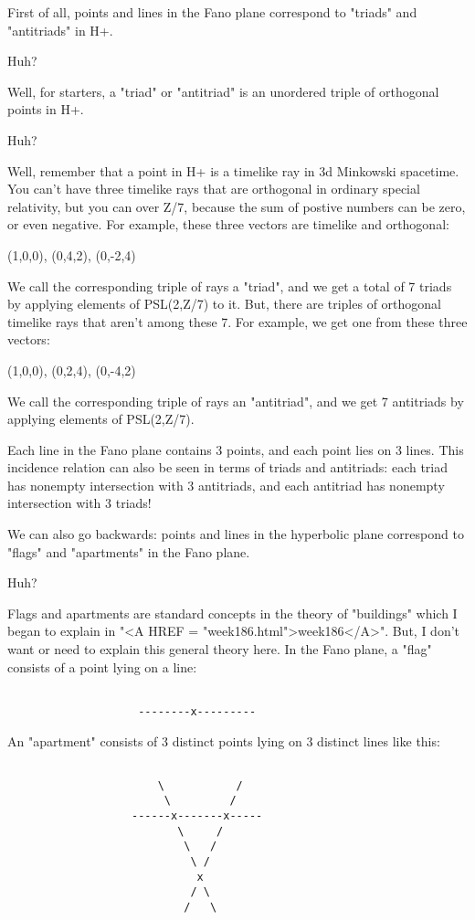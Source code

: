 First of all, points and lines in the Fano plane correspond to "triads" and 
"antitriads" in H+.

Huh?  

Well, for starters, a "triad" or "antitriad" is an unordered triple of orthogonal 
points in H+.   

Huh?  

Well, remember that a point in H+ is a timelike ray in 3d Minkowski spacetime.
You can't have three timelike rays that are orthogonal in ordinary special 
relativity, but you can over Z/7, because the sum of postive numbers can be zero, 
or even negative.  For example, these three vectors are timelike and orthogonal:

(1,0,0),   (0,4,2),    (0,-2,4)

We call the corresponding triple of rays a 
"triad", and we get a total of 7 triads 
by applying elements of PSL(2,Z/7) to it.  But, there are triples of orthogonal 
timelike rays that aren't among these 7.  For example, we get one from these three 
vectors:

(1,0,0),    (0,2,4),   (0,-4,2)

We call the corresponding triple of rays an "antitriad", 
and we get 7  
antitriads by applying elements of PSL(2,Z/7).

Each line in the Fano plane contains 3 points, and each point lies on 3
lines.  This incidence relation can also be seen in terms of triads and
antitriads: each triad has nonempty intersection with 3 antitriads, and
each antitriad has nonempty intersection with 3 triads!

We can also go backwards: points and lines in the hyperbolic plane correspond
to "flags" and "apartments" in the Fano plane.  

Huh?

Flags and apartments are standard concepts in the 
theory of "buildings"
which I began to explain in "<A HREF = "week186.html">week186</A>".  
But, I don't want or need to explain
this general theory here.  In the Fano plane, a "flag" 
consists of a point
lying on a line:

\begin{verbatim}
                  
                    --------x---------
\end{verbatim}
    
An "apartment" 
consists of 3 distinct points lying on 3 distinct lines like
this:

\begin{verbatim}

                       \           /
                        \         /
                   ------x-------x-----
                          \     /
                           \   /
                            \ /
                             x
                            / \
                           /   \
\end{verbatim}
    
